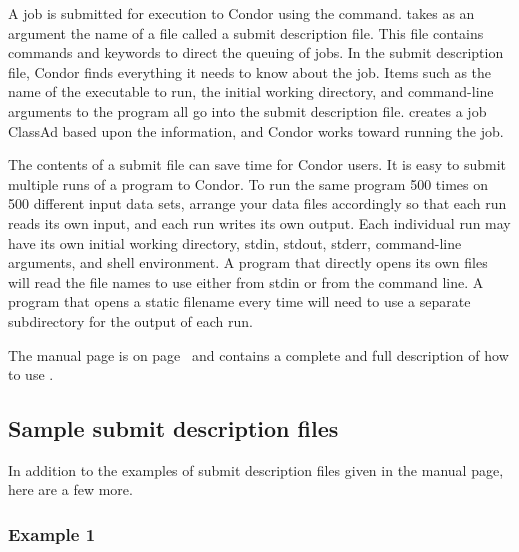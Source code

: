 A job is submitted for execution to Condor using the
 command.
 takes as an argument the name of a
file called a submit description file.
This file contains commands and keywords to direct the queuing of jobs.
In the submit description file, Condor finds everything it needs
to know about the job.  Items such as the name of the executable to run,
the initial working directory, and command-line arguments to the
program all go into
the submit description file.   creates a job
ClassAd based upon the information,
and Condor
works toward running the job.

The contents of a submit file
can save time for Condor users.
It is easy to submit multiple runs of a program to
Condor. To run the same program 500 times on 500
different input data sets, arrange your data files
accordingly so that each run reads its own input, and each run
writes its own output.
Each individual run may have its own initial
working directory, stdin, stdout, stderr, command-line arguments, and
shell environment.
A program that directly opens its own
files will read the file names to use either from stdin
or from the command line. 
A program that opens a static filename every time
will need to use a separate subdirectory for the output of each run.

The  manual page 
is on page~\pageref{man-condor-submit} and
contains a complete and full description of how to use .

\subsection{\label{sec:sample-submit-files}Sample submit description files}  

In addition to the examples of submit description files given
in the 
 manual page, here are a few more.

\subsubsection{Example 1} 

